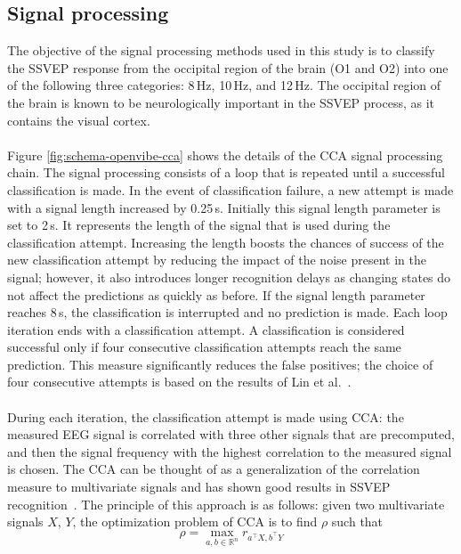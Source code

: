 \documentclass[smallextended]{svjour3}
\begin{document}
\subsection{Signal processing}

The objective of the signal processing methods used in this study is to classify the SSVEP response from the occipital region of the brain (O1 and O2) into one of the following three categories: 8\,Hz, 10\,Hz, and 12\,Hz.
The occipital region of the brain is known to be neurologically important in the SSVEP process, as it contains the visual cortex.\\
\\
Figure \ref{fig:schema-openvibe-cca} shows the details of the CCA signal processing chain.
The signal processing consists of a loop that is repeated until a successful classification is made.
In the event of classification failure, a new attempt is made with a signal length increased by 0.25\,s.
Initially this signal length parameter is set to 2\,s.
It represents the length of the signal that is used during the classification attempt.
Increasing the length boosts the chances of success of the new classification attempt by reducing the impact of the noise present in the signal; however, it also introduces longer recognition delays as changing states do not affect the predictions as quickly as before.
If the signal length parameter reaches 8\,s, the classification is interrupted and no prediction is made.
Each loop iteration ends with a classification attempt.
A classification is considered successful only if four consecutive classification attempts reach the same prediction. This measure significantly reduces the false positives; the choice of four consecutive attempts is based on the results of Lin et al.~\cite{Lin2014}.\\
\\
During each iteration, the classification attempt is made using CCA: the measured EEG signal is correlated with three other signals that are precomputed, and then the signal frequency with the highest correlation to the measured signal is chosen.
The CCA can be thought of as a generalization of the correlation measure to multivariate signals and has shown good results in SSVEP recognition~\cite{Lin2014}. The principle of this approach is as follows: given two multivariate signals $X$, $Y$, the optimization problem of CCA is to find $\rho$ such that
\\
\begin{equation}
\label{rho}
\rho = \max_{a, b \in \mathbb R^n} r_{ a^\top X, b^\top Y}
\end{equation}
\end{document}
